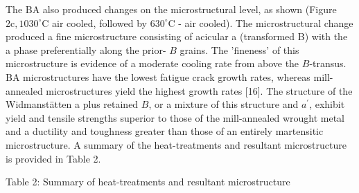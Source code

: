 \documentclass[10pt]{article}
\begin{document}
The BA also produced changes on the microstructural level, as shown (Figure $2 \mathrm{c}, 1030^{\circ} \mathrm{C}$ air cooled, followed by $630^{\circ} \mathrm{C}$ - air cooled). The microstructural change produced a fine microstructure consisting of acicular a (transformed B) with the a phase preferentially along the prior- $B$ grains. The 'fineness' of this microstructure is evidence of a moderate cooling rate from above the $B$-transus. BA microstructures have the lowest fatigue crack growth rates, whereas mill-annealed microstructures yield the highest growth rates [16]. The structure of the Widmanstätten a plus retained $B$, or a mixture of this structure and $a^{\prime}$, exhibit yield and tensile strengths superior to those of the mill-annealed wrought metal and a ductility and toughness greater than those of an entirely martensitic microstructure. A summary of the heat-treatments and resultant microstructure is provided in Table 2.

Table 2: Summary of heat-treatments and resultant microstructure
\end{document}
